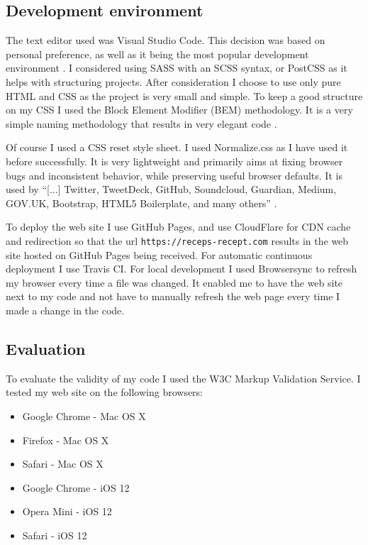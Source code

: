 \documentclass[a4paper]{scrartcl}
\begin{document}
\subsection{Development environment}
\label{method:development}

The text editor used was Visual Studio Code. This decision was based on personal preference, as well as it being the most popular development environment \cite{Stackoverflow}. I considered using SASS with an SCSS syntax, or PostCSS as it helps with structuring projects. After consideration I choose to use only pure HTML and CSS as the project is very small and simple. To keep a good structure on my CSS I used the Block Element Modifier (BEM) methodology. It is a very simple naming methodology that results in very elegant code \cite{Starkov}.

Of course I used a CSS reset style sheet. I used Normalize.css as I have used it before successfully. It is very lightweight and primarily aims at fixing browser bugs and inconsistent behavior, while preserving useful browser defaults. It is used by ``[...] Twitter, TweetDeck, GitHub, Soundcloud, Guardian, Medium, GOV.UK, Bootstrap, HTML5 Boilerplate, and many others'' \cite{Gallagher}.

To deploy the web site I use GitHub Pages, and use CloudFlare for CDN cache and redirection so that the url \texttt{https://receps-recept.com} results in the web site hosted on GitHub Pages being received. For automatic continuous deployment I use Travis CI. For local development I used Browsersync to refresh my browser every time a file was changed. It enabled me to have the web site next to my code and not have to manually refresh the web page every time I made a change in the code.

\subsection{Evaluation}
\label{method:evaluation}

To evaluate  the validity of my code I used the W3C Markup Validation Service. I tested my web site on the following browsers:
\begin{itemize}
	\item Google Chrome - Mac OS X
	\item Firefox - Mac OS X
	\item Safari - Mac OS X
	\item Google Chrome - iOS 12
	\item Opera Mini - iOS 12
	\item Safari - iOS 12
\end{itemize}
\end{document}

